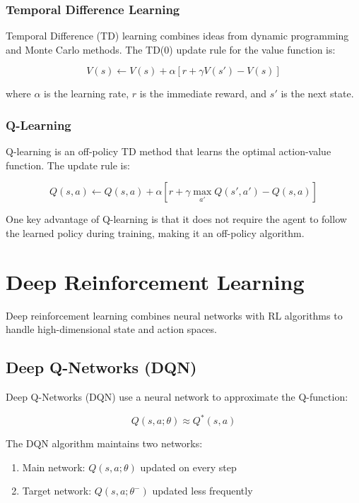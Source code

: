 \documentclass[10pt]{article}
\begin{document}
\subsubsection{Temporal Difference Learning}

Temporal Difference (TD) learning combines ideas from dynamic programming and Monte Carlo methods. The TD(0) update rule for the value function is:

\[
V(s) \leftarrow V(s) + \alpha \left[r + \gamma V(s') - V(s)\right]
\]

where $\alpha$ is the learning rate, $r$ is the immediate reward, and $s'$ is the next state.

\subsubsection{Q-Learning}

Q-learning is an off-policy TD method that learns the optimal action-value function. The update rule is:

\[
Q(s,a) \leftarrow Q(s,a) + \alpha \left[r + \gamma \max_{a'} Q(s',a') - Q(s,a)\right]
\]

One key advantage of Q-learning is that it does not require the agent to follow the learned policy during training, making it an off-policy algorithm.

\section{Deep Reinforcement Learning}

Deep reinforcement learning combines neural networks with RL algorithms to handle high-dimensional state and action spaces. 

\subsection{Deep Q-Networks (DQN)}

Deep Q-Networks (DQN) use a neural network to approximate the Q-function:

\[
Q(s,a;\theta) \approx Q^*(s,a)
\]

The DQN algorithm maintains two networks:
\begin{enumerate}
    \item Main network: $Q(s,a;\theta)$ updated on every step
    \item Target network: $Q(s,a;\theta^-)$ updated less frequently
\end{enumerate}
\end{document}

